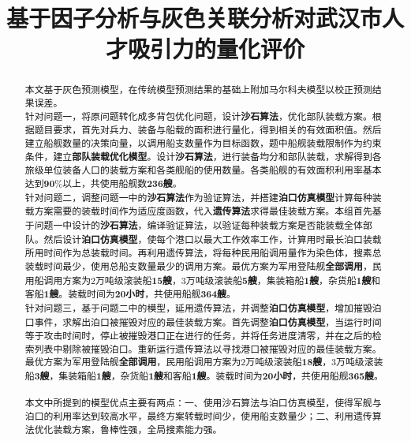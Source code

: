 \documentclass{whutmod}
\title{基于因子分析与灰色关联分析对武汉市人才吸引力的量化评价}
\begin{document}
	
	\begin{abstract}



本文基于灰色预测模型，在传统模型预测结果的基础上附加马尔科夫模型以校正预测结果误差。
~\\

针对问题一，将原问题转化成多背包优化问题，设计\textbf{沙石算法}，优化部队装载方案。根据题目要求，首先对兵力、装备与船载的面积进行量化，得到相关的有效面积值。然后建立船舰数量的决策向量，以调用船支数量作为目标函数，题中船舰装载限制作为约束条件，建立\textbf{部队装载优化模型}。设计\textbf{沙石算法}，进行装备均分和部队装载，求解得到各旅级单位装备人口的装载方案和各类舰船的使用数量。各类船舰的有效面积利用率基本达到$\textbf{90\%}$以上，共使用船舰数\textbf{236艘}。
~\\



针对问题二，调整问题一中的\textbf{沙石算法}作为验证算法，并搭建\textbf{泊口仿真模型}计算每种装载方案需要的装载时间作为适应度函数，代入\textbf{遗传算法}求得最佳装载方案。本组首先基于问题一中设计的\textbf{沙石算法}，编译验证算法，以验证每种装载方案是否能装载全体部队。然后设计\textbf{泊口仿真模型}，使每个港口以最大工作效率工作，计算用时最长泊口装载所用时间作为总装载时间。再利用遗传算法，将每种民用船调用量作为染色体，搜素总装载时间最少，使用总船支数量最少的调用方案。最优方案为军用登陆舰\textbf{全部调用}，民用船调用方案为2万吨级滚装船\textbf{15艘}，3万吨级滚装船\textbf{5艘}，集装箱船\textbf{1艘}，杂货船\textbf{1艘}和客船\textbf{1艘}。装载时间为\textbf{20小时}，共使用船舰\textbf{364艘}。
~\\

针对问题三，基于问题二中的模型，延用遗传算法，并调整\textbf{泊口仿真模型}，增加摧毁泊口事件，求解出泊口被摧毁对应的最佳装载方案。首先调整\textbf{泊口仿真模型}，当运行时间等于攻击时间时，停止被摧毁港口正在进行的任务，并将任务进度清零，并在之后的检索列表中剔除被摧毁泊口。重新运行遗传算法以寻找港口被摧毁对应的最佳装载方案。最优方案为军用登陆舰\textbf{全部调用}，民用船调用方案为2万吨级滚装船\textbf{18艘}，3万吨级滚装船\textbf{3艘}，集装箱船\textbf{1艘}，杂货船\textbf{1艘}和客船\textbf{1艘}。装载时间为\textbf{20小时}，共使用船舰\textbf{365艘}。
~\\

本文中所提到的模型优点主要有两点：一、使用沙石算法与泊口仿真模型，使得军舰与泊口的利用率达到较高水平，最终方案转载时间少，使用船支数量少；二、利用遗传算法优化装载方案，鲁棒性强，全局搜素能力强。

	
  



	\end{abstract}
	
\end{document}
